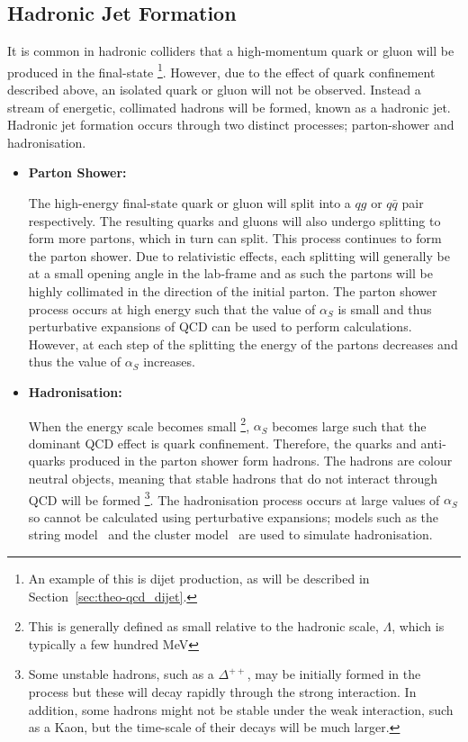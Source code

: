 \subsection{Hadronic Jet Formation}
\label{sec:theo-qcd_jets}

It is common in hadronic colliders that a high-momentum quark or gluon will be produced in the final-state
\footnote{An example of this is dijet production, as will be described in Section~\ref{sec:theo-qcd_dijet}.}.
However, due to the effect of quark confinement described above, an isolated quark or gluon will not be observed.
Instead a stream of energetic, collimated hadrons will be formed, known as a hadronic jet.
Hadronic jet formation occurs through two distinct processes; parton-shower and hadronisation.

\begin{itemize}[leftmargin=*]
  
\item\textbf{Parton Shower:}

  The high-energy final-state quark or gluon will split into a $qg$ or $q\bar{q}$ pair respectively.
  The resulting quarks and gluons will also undergo splitting to form more partons,
  which in turn can split. This process continues to form the parton shower.
  Due to relativistic effects, each splitting will generally be at a small opening angle in the lab-frame
  and as such the partons will be highly collimated in the direction of the initial parton.
  The parton shower process occurs at high energy such that the value of $\alpha_S$ is small
  and thus perturbative expansions of QCD can be used to perform calculations.
  However, at each step of the splitting the energy of the partons decreases
  and thus the value of $\alpha_S$ increases.\vspace{0.5em}
  
\item\textbf{Hadronisation:}
  
  When the energy scale becomes small
  \footnote{This is generally defined as small relative to the hadronic scale, $\Lambda$, which is typically a few hundred MeV},
  $\alpha_S$ becomes large such that the dominant QCD effect is quark confinement.
  Therefore, the quarks and anti-quarks produced in the parton shower form hadrons.
  The hadrons are colour neutral objects, meaning that stable hadrons that do not interact through QCD will be formed
  \footnote{Some unstable hadrons, such as a $\Delta^{++}$, may be initially formed in the process but these will decay rapidly through the strong interaction.
    In addition, some hadrons might not be stable under the weak interaction, such as a Kaon, but the time-scale of their decays will be much larger.}.
  The hadronisation process occurs at large values of $\alpha_S$ so cannot be calculated using perturbative expansions;
  models such as the string model~\cite{theo-qcd_jet_string} and the
  cluster model~\cite{theo-qcd_jet_cluster} are used to simulate hadronisation.

\end{itemize}
  
